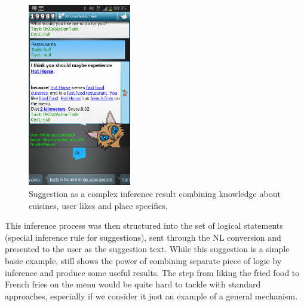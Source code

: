 \begin{figure}[htb]
	\centering
		\includegraphics[width=0.4\textwidth]{figures/assistExample2.png}
	\caption{Suggestion as a complex inference result combining knowledge about cuisines, user likes and place specifics.}
	\label{fig:assist2}
\end{figure}

This inference process was then structured into the set of logical statements 
(special inference rule for suggestions), sent through the NL conversion  and 
presented to the user as the suggestion text. 
While this suggestion is a simple basic example, still shows the power of 
combining separate piece of logic by inference and produce some useful results. 
The step from liking the fried food to French fries on the menu would be quite 
hard to tackle with standard approaches, especially if we consider it just an 
example of a general mechanism.

